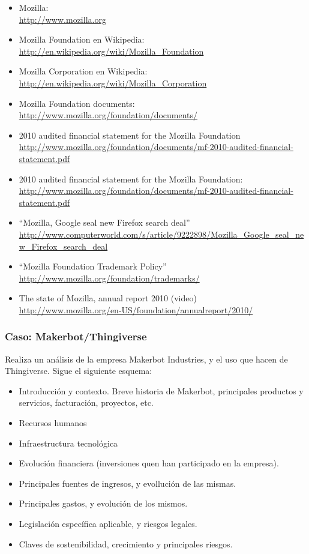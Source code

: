 \documentclass[a4paper,12pt]{article}
\begin{document}
\begin{itemize}
\item Mozilla: \\
  \url{http://www.mozilla.org}
\item Mozilla Foundation en Wikipedia: \\
  \url{http://en.wikipedia.org/wiki/Mozilla_Foundation}
\item Mozilla Corporation en Wikipedia: \\
  \url{http://en.wikipedia.org/wiki/Mozilla_Corporation}
\item Mozilla Foundation documents: \\
  \url{http://www.mozilla.org/foundation/documents/}
\item 2010 audited financial statement for the Mozilla Foundation \\
  \url{http://www.mozilla.org/foundation/documents/mf-2010-audited-financial-statement.pdf}
\item 2010 audited financial statement for the Mozilla Foundation: \\
  \url{http://www.mozilla.org/foundation/documents/mf-2010-audited-financial-statement.pdf}
\item ``Mozilla, Google seal new Firefox search deal'' \\
  \url{http://www.computerworld.com/s/article/9222898/Mozilla_Google_seal_new_Firefox_search_deal}
\item ``Mozilla Foundation Trademark Policy'' \\
  \url{http://www.mozilla.org/foundation/trademarks/}
\item The state of Mozilla, annual report 2010 (video) \\
  \url{http://www.mozilla.org/en-US/foundation/annualreport/2010/}
\end{itemize}

\subsubsection{Caso: Makerbot/Thingiverse}
\label{sub:case-thingiverse}

Realiza un análisis de la empresa Makerbot Industries, y el uso que hacen de Thingiverse. Sigue el siguiente esquema:

\begin{itemize}
\item Introducción y contexto. Breve historia de Makerbot, principales productos y servicios, facturación, proyectos, etc.
\item Recursos humanos
\item Infraestructura tecnológica
\item Evolución financiera (inversiones quen han participado en la empresa).
\item Principales fuentes de ingresos, y evollución de las mismas.
\item Principales gastos, y evolución de los mismos.
\item Legislación específica aplicable, y riesgos legales.
\item Claves de sostenibilidad, crecimiento y principales riesgos.
\end{itemize}
\end{document}

